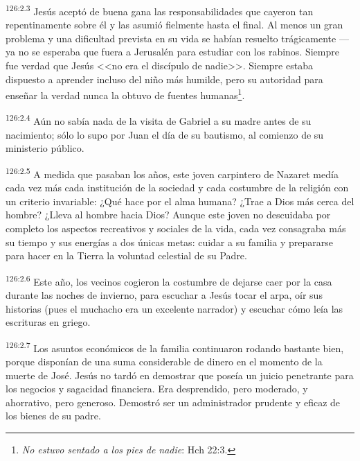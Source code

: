 \par 
\textsuperscript{126:2.3} Jesús aceptó de buena gana las responsabilidades que cayeron tan repentinamente sobre él y las asumió fielmente hasta el final. Al menos un gran problema y una dificultad prevista en su vida se habían resuelto trágicamente ---ya no se esperaba que fuera a Jerusalén para estudiar con los rabinos. Siempre fue verdad que Jesús <<no era el discípulo de nadie>>. Siempre estaba dispuesto a aprender incluso del niño más humilde, pero su autoridad para enseñar la verdad nunca la obtuvo de fuentes humanas\footnote{\textit{No estuvo sentado a los pies de nadie}: Hch 22:3.}.

\par 
\textsuperscript{126:2.4} Aún no sabía nada de la visita de Gabriel a su madre antes de su nacimiento; sólo lo supo por Juan el día de su bautismo, al comienzo de su ministerio público.

\par 
\textsuperscript{126:2.5} A medida que pasaban los años, este joven carpintero de Nazaret medía cada vez más cada institución de la sociedad y cada costumbre de la religión con un criterio invariable: ¿Qué hace por el alma humana? ¿Trae a Dios más cerca del hombre? ¿Lleva al hombre hacia Dios? Aunque este joven no descuidaba por completo los aspectos recreativos y sociales de la vida, cada vez consagraba más su tiempo y sus energías a dos únicas metas: cuidar a su familia y prepararse para hacer en la Tierra la voluntad celestial de su Padre.

\par 
\textsuperscript{126:2.6} Este año, los vecinos cogieron la costumbre de dejarse caer por la casa durante las noches de invierno, para escuchar a Jesús tocar el arpa, oír sus historias (pues el muchacho era un excelente narrador) y escuchar cómo leía las escrituras en griego.

\par 
\textsuperscript{126:2.7} Los asuntos económicos de la familia continuaron rodando bastante bien, porque disponían de una suma considerable de dinero en el momento de la muerte de José. Jesús no tardó en demostrar que poseía un juicio penetrante para los negocios y sagacidad financiera. Era desprendido, pero moderado, y ahorrativo, pero generoso. Demostró ser un administrador prudente y eficaz de los bienes de su padre.

